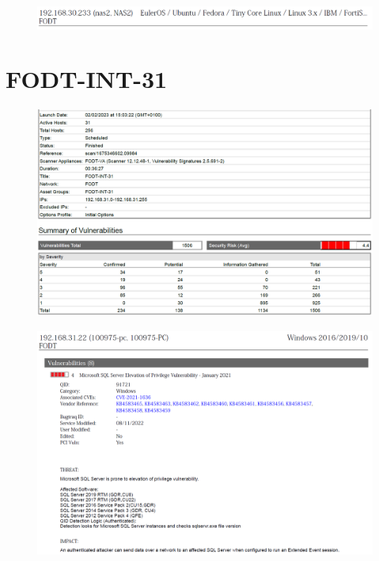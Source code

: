 \documentclass[target=bach,aauheader=]{thud}
\begin{document}
\begin{figure}[h]
    \centering
    \includegraphics[width=1\linewidth]{images/FODT-INT-13_3.png}
    \caption{}
    \label{fig:fodt-int-13_3}
\end{figure}

\pagebreak

\section{FODT-INT-31}

\begin{figure}[h]
    \centering
    \includegraphics[width=1\linewidth]{images/FODT-INT-31_1.png}
    \caption{}
    \label{fig:fodt-int-31_1}
\end{figure}

\pagebreak

\begin{figure}[h]
    \centering
    \includegraphics[width=1\linewidth]{images/FODT-INT-31_2.png}
    \caption{}
    \label{fig:fodt-int-31_2}
\end{figure}
\end{document}
